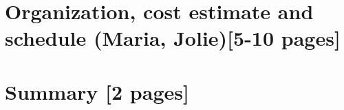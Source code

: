 \ifdefined\isfinal\documentclass[final]{pd-tdr}\else\documentclass{pd-tdr}\fi
\begin{document}
\chapter{Organization, cost estimate and schedule {\color{red}  (Maria, Jolie)[5-10 pages]}}
%


%
% 


\newpage
\chapter{Summary {\color{red}[2 pages]}}
%



% 

\cleardoublepage


\end{document}
